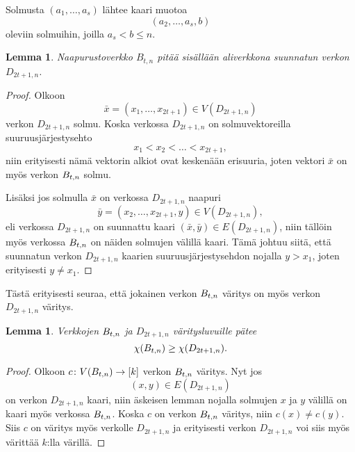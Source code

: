\documentclass[finnish]{tktltiki2}
\newtheorem{lem}[lau]{Lemma}
\theoremstyle{definition}
\theoremstyle{remark}
\newcommand{\from}{\colon}
\begin{document}
Solmusta $(a_1,\dots,a_s)$ lähtee kaari muotoa
%
\begin{equation*}
    (a_2,\dots,a_s,b)
\end{equation*}
%
oleviin solmuihin, joilla $a_s < b \leq n$.

\begin{lem}
    Naapurustoverkko $B_{t,n}$ pitää sisällään aliverkkona suunnatun verkon
    $D_{2t+1,n}$.
\end{lem}

\newcommand{\D}{D_{2t+1,n}}
\begin{proof}
    Olkoon
    \begin{equation*}
        \bar{x} = (x_1, \dots, x_{2t+1}) \in V(\D)
    \end{equation*}
    verkon $\D$ solmu.  Koska verkossa $\D$ on solmuvektoreilla
    suu\-ruus\-jär\-jes\-tys\-eh\-to
    \begin{equation*}
        x_1 < x_2 < \dots < x_{2t+1},
    \end{equation*}
    niin erityisesti nämä vektorin alkiot ovat keskenään erisuuria, joten
    vektori $\bar{x}$ on myös verkon $B_{t,n}$ solmu.

    Lisäksi jos solmulla $\bar{x}$ on verkossa $\D$ naapuri
    \begin{equation*}
            \bar{y} = (x_2, \dots, x_{2t+1}, y) \in V(\D),
    \end{equation*}
    eli verkossa $\D$ on suunnattu kaari $(\bar{x},\bar{y}) \in E(\D)$, niin
    tällöin myös verkossa $B_{t,n}$ on näiden solmujen välillä kaari. Tämä
    johtuu siitä, että suunnatun verkon $\D$ kaarien suuruusjärjestysehdon
    nojalla $y > x_1$, joten erityisesti $y \neq x_1$.
\end{proof}

Tästä erityisesti seuraa, että jokainen verkon $B_{t,n}$ väritys on myös verkon
$\D$ väritys.

\begin{lem}
    Verkkojen $B_{t,n}$ ja $\D$ väritysluvuille pätee
    \begin{equation*}
        \chi(\Btn) \geq \chi(\D).
    \end{equation*}
\end{lem}

\begin{proof}
    Olkoon $c \from V(\Btn) \to [k]$ verkon $B_{t,n}$ väritys. Nyt jos
    \begin{equation*}
            (x,y) \in E(\D)
    \end{equation*}
    on verkon $\D$ kaari, niin äskeisen lemman nojalla solmujen $x$ ja
    $y$ välillä on kaari myös verkossa $B_{t,n}$. Koska $c$ on verkon $B_{t,n}$
    väritys, niin $c(x) \neq c(y)$. Siis $c$ on väritys myös verkolle $\D$ ja
    erityisesti verkon $\D$ voi siis myös värittää $k$:lla värillä.
\end{proof}
\end{document}
